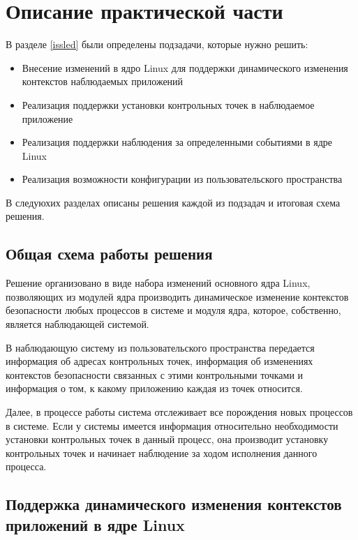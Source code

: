 \newpage
\section{Описание практической части}

В разделе \ref{issled} были определены подзадачи,
которые нужно решить:
\begin{itemize}

\item Внесение изменений в ядро Linux для поддержки динамического
        изменения контекстов наблюдаемых приложений

\item Реализация поддержки установки контрольных точек в наблюдаемое
        приложение

\item Реализация поддержки наблюдения за определенными событиями в
        ядре Linux

\item Реализация возможности конфигурации из пользовательского
        пространства
        
\end{itemize}

В следуюхих разделах описаны решения каждой из подзадач и итоговая
схема решения.

\subsection{Общая схема работы решения}

Решение организовано в виде набора изменений основного ядра Linux,
позволяющих из модулей ядра производить динамическое изменение
контекстов безопасности любых процессов в системе и модуля
ядра, которое, собственно, является наблюдающей системой.

В наблюдающую систему из пользовательского пространства передается
информация об адресах контрольных точек, информация об изменениях
контекстов безопасности связанных с этими контрольными
точками и информация о том, к какому приложению каждая из точек относится.

Далее, в процессе работы система отслеживает все порождения новых процессов
в системе. Если у системы имеется информация относительно необходимости
установки контрольных точек в данный процесс, она производит установку
контрольных точек и начинает наблюдение за ходом исполнения данного процесса.

\subsection{Поддержка динамического изменения контекстов приложений
            в ядре Linux}

